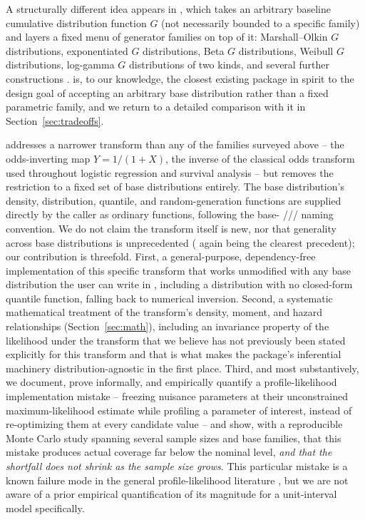 \documentclass[article]{jss}
\begin{document}
A structurally different idea appears in , which takes an arbitrary baseline cumulative distribution function $G$ (not necessarily bounded to a specific family) and layers a fixed menu of generator families on top of it: Marshall--Olkin $G$ distributions, exponentiated $G$ distributions, Beta $G$ distributions, Weibull $G$ distributions, log-gamma $G$ distributions of two kinds, and several further constructions \citep{nadarajah2016newdistns}.  is, to our knowledge, the closest existing  package in spirit to the design goal of accepting an arbitrary base distribution rather than a fixed parametric family, and we return to a detailed comparison with it in Section~\ref{sec:tradeoffs}.

 addresses a narrower transform than any of the families surveyed above -- the odds-inverting map $Y = 1/(1+X)$, the inverse of the classical odds transform used throughout logistic regression and survival analysis \citep{cox1958,agresti2013} -- but removes the restriction to a fixed set of base distributions entirely. The base distribution's density, distribution, quantile, and random-generation functions are supplied directly by the caller as ordinary  functions, following the base- /// naming convention. We do not claim the transform itself is new, nor that generality across base distributions is unprecedented ( again being the clearest precedent); our contribution is threefold. First, a general-purpose, dependency-free implementation of this specific transform that works unmodified with any base distribution the user can write in , including a distribution with no closed-form quantile function, falling back to numerical inversion. Second, a systematic mathematical treatment of the transform's density, moment, and hazard relationships (Section~\ref{sec:math}), including an invariance property of the likelihood under the transform that we believe has not previously been stated explicitly for this transform and that is what makes the package's inferential machinery distribution-agnostic in the first place. Third, and most substantively, we document, prove informally, and empirically quantify a profile-likelihood implementation mistake -- freezing nuisance parameters at their unconstrained maximum-likelihood estimate while profiling a parameter of interest, instead of re-optimizing them at every candidate value -- and show, with a reproducible Monte Carlo study spanning several sample sizes and base families, that this mistake produces actual coverage far below the nominal level, \emph{and that the shortfall does not shrink as the sample size grows}. This particular mistake is a known failure mode in the general profile-likelihood literature \citep{murphyvandervaart2000,severini2000}, but we are not aware of a prior empirical quantification of its magnitude for a unit-interval model specifically.
\end{document}
